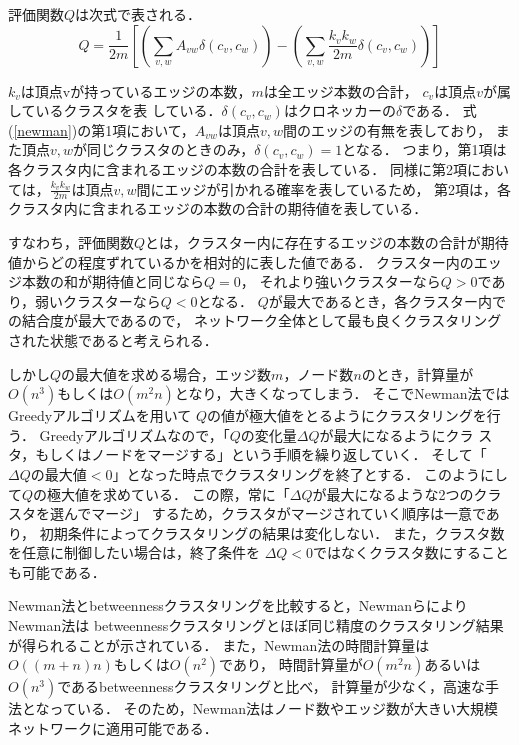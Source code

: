 \documentclass[japanese]{jnlp_1.3a}
\begin{document}
評価関数$Q$は次式で表される．
\begin{equation}
\label{newman}
Q=\frac{1}{2m}\left[ \left( \sum_{v,w} A_{vw}\delta(c_v,c_w)\right) - 
\left(\sum_{v,w} \frac{k_v k_w}{2m}\delta(c_v,c_w)\right) \right] 
\end{equation}

$k_v$は頂点vが持っているエッジの本数，$m$は全エッジ本数の合計，
$c_v$は頂点$v$が属しているクラスタを表
している．$\delta(c_v,c_w)$はクロネッカーの$\delta$である．
式(\ref{newman})の第1項において，$A_{vw}$は頂点$v,w$間のエッジの有無を表しており，
また頂点$v,w$が同じクラスタのときのみ，$\delta(c_v,c_w)=1$となる．
つまり，第1項は各クラスタ内に含まれるエッジの本数の合計を表している．
同様に第2項においては，$\frac{k_v k_w}{2m}$は頂点$v,w$間にエッジが引かれる確率を表しているため，
第2項は，各クラスタ内に含まれるエッジの本数の合計の期待値を表している．

すなわち，評価関数$Q$とは，クラスター内に存在するエッジの本数の合計が期待値からどの程度ずれているかを相対的に表した値である．
クラスター内のエッジ本数の和が期待値と同じなら$Q=0$，
それより強いクラスターなら$Q>0$であり，弱いクラスターなら$Q<0$となる．
$Q$が最大であるとき，各クラスター内での結合度が最大であるので，
ネットワーク全体として最も良くクラスタリングされた状態であると考えられる．


しかし$Q$の最大値を求める場合，エッジ数$m$，ノード数$n$のとき，計算量が
$O(n^3)$もしくは$O(m^2n)$となり，大きくなってしまう．
そこでNewman法ではGreedyアルゴリズムを用いて
$Q$の値が極大値をとるようにクラスタリングを行う．
Greedyアルゴリズムなので，「$Q$の変化量$\Delta Q$が最大になるようにクラ
スタ，もしくはノードをマージする」という手順を繰り返していく．
そして「$\Delta Qの最大値<0$」となった時点でクラスタリングを終了とする．
このようにして$Q$の極大値を求めている．
この際，常に「$\Delta Q$が最大になるような2つのクラスタを選んでマージ」
するため，クラスタがマージされていく順序は一意であり，
初期条件によってクラスタリングの結果は変化しない．
また，クラスタ数を任意に制御したい場合は，終了条件を
$\Delta Q < 0$ではなくクラスタ数にすることも可能である．

Newman法とbetweennessクラスタリングを比較すると，NewmanらによりNewman法は
betweennessクラスタリングとほぼ同じ精度のクラスタリング結果が得られることが示されている．
また，Newman法の時間計算量は$O((m+n)n)$もしくは$O(n^2)$であり，
時間計算量が$O(m^2n)$あるいは$O(n^3)$であるbetweennessクラスタリングと比べ，
計算量が少なく，高速な手法となっている．
そのため，Newman法はノード数やエッジ数が大きい大規模ネットワークに適用可能である．
\end{document}
